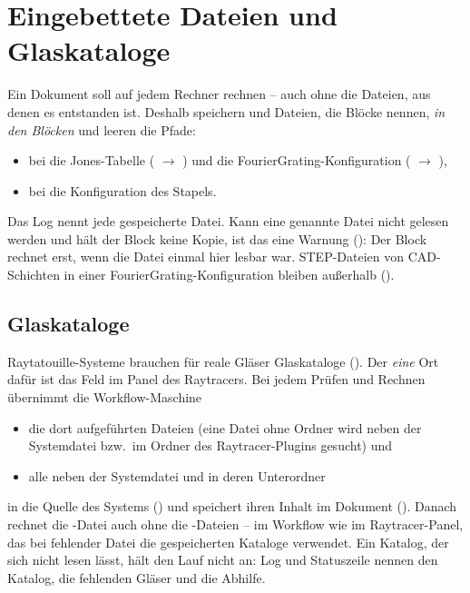 \section{Eingebettete Dateien und Glaskataloge}\label{sec:workflow-eingebettet}

Ein Dokument soll auf jedem Rechner rechnen – auch ohne die Dateien, aus denen es entstanden ist.
Deshalb speichern  und  Dateien, die Blöcke nennen,
\emph{in den Blöcken} und leeren die Pfade:

\begin{itemize}
  \item bei  die Jones-Tabelle ( $\to$ ) und die
        FourierGrating-Konfiguration ( $\to$ ),
  \item bei  die Konfiguration des Stapels.
\end{itemize}

Das Log nennt jede gespeicherte Datei. Kann eine genannte Datei nicht gelesen werden und hält der
Block keine Kopie, ist das eine Warnung (): Der Block rechnet erst,
wenn die Datei einmal hier lesbar war. STEP-Dateien von CAD-Schichten in einer
FourierGrating-Konfiguration bleiben außerhalb ().

\subsection{Glaskataloge}

Raytatouille-Systeme brauchen für reale Gläser Glaskataloge (). Der \emph{eine} Ort
dafür ist das Feld  im Panel des Raytracers. Bei jedem Prüfen und Rechnen
übernimmt die Workflow-Maschine

\begin{itemize}
  \item die dort aufgeführten Dateien (eine Datei ohne Ordner wird neben der Systemdatei bzw.\
        im Ordner des Raytracer-Plugins gesucht) und
  \item alle  neben der Systemdatei und in deren Unterordner 
\end{itemize}

in die Quelle des Systems () und speichert ihren Inhalt im Dokument
(\param{rtt\_catalog\_data}). Danach rechnet die \datei{.rttf}-Datei auch ohne die
\datei{.agf}-Dateien – im Workflow wie im Raytracer-Panel, das bei fehlender Datei die
gespeicherten Kataloge verwendet. Ein Katalog, der sich nicht lesen lässt, hält den Lauf nicht
an: Log und Statuszeile nennen den Katalog, die fehlenden Gläser und die Abhilfe.

